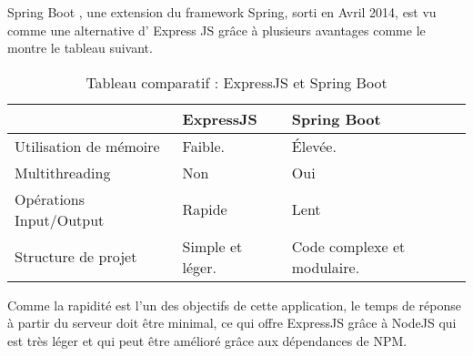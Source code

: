 Spring Boot \cite{spring}, une extension du framework Spring, sorti en Avril 2014, est vu comme une alternative d' Express JS grâce à plusieurs avantages comme le montre le tableau suivant.
\begin{table}[H]
    \begin{center}
        \begin{tabularx}{\textwidth} {
                | >{\centering\arraybackslash}X
                | >{\centering\arraybackslash}X
                | >{\centering\arraybackslash}X |}
            \hline
                                    & ExpressJS        & Spring Boot                 \\
            \hline
            Utilisation de mémoire  & Faible.          & Élevée.                     \\
            \hline
            Multithreading          & Non              & Oui                         \\
            \hline
            Opérations Input/Output & Rapide           & Lent                        \\
            \hline
            Structure de projet     & Simple et léger. & Code complexe et modulaire. \\
            \hline
        \end{tabularx}
        \captionsetup{justification = centering}
        \caption{Tableau comparatif : ExpressJS et Spring Boot}
        \label{compare_spring_boot_expressjs}
    \end{center}
\end{table}
Comme la rapidité est l'un des objectifs de cette application, le temps de réponse à partir du serveur doit être minimal, ce qui offre ExpressJS grâce à NodeJS qui est très léger et qui peut être amélioré grâce aux dépendances de NPM.

